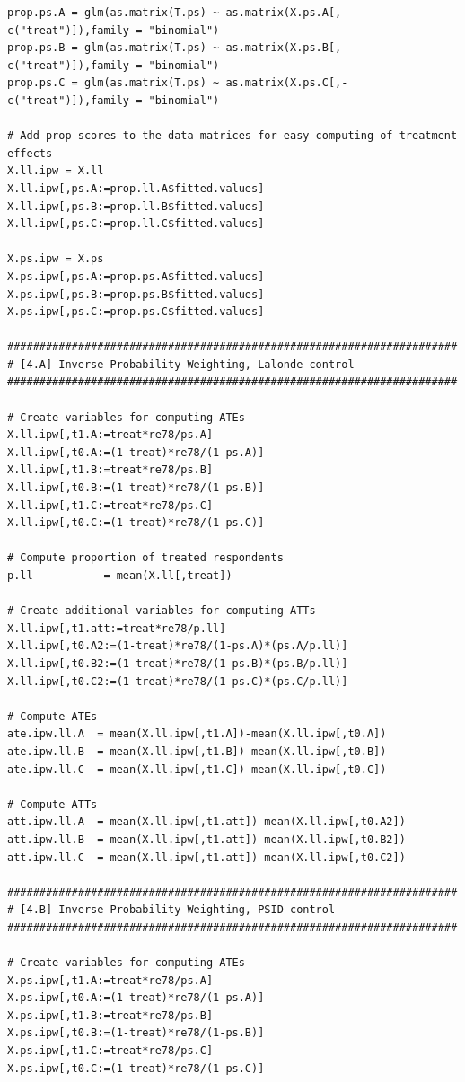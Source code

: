 \documentclass[12pt]{article}
\begin{document}
\begin{verbatim}
prop.ps.A = glm(as.matrix(T.ps) ~ as.matrix(X.ps.A[,-c("treat")]),family = "binomial")
prop.ps.B = glm(as.matrix(T.ps) ~ as.matrix(X.ps.B[,-c("treat")]),family = "binomial")
prop.ps.C = glm(as.matrix(T.ps) ~ as.matrix(X.ps.C[,-c("treat")]),family = "binomial")

# Add prop scores to the data matrices for easy computing of treatment effects
X.ll.ipw = X.ll
X.ll.ipw[,ps.A:=prop.ll.A$fitted.values]
X.ll.ipw[,ps.B:=prop.ll.B$fitted.values]
X.ll.ipw[,ps.C:=prop.ll.C$fitted.values]

X.ps.ipw = X.ps
X.ps.ipw[,ps.A:=prop.ps.A$fitted.values]
X.ps.ipw[,ps.B:=prop.ps.B$fitted.values]
X.ps.ipw[,ps.C:=prop.ps.C$fitted.values]

######################################################################
# [4.A] Inverse Probability Weighting, Lalonde control
######################################################################

# Create variables for computing ATEs 
X.ll.ipw[,t1.A:=treat*re78/ps.A]
X.ll.ipw[,t0.A:=(1-treat)*re78/(1-ps.A)]
X.ll.ipw[,t1.B:=treat*re78/ps.B]
X.ll.ipw[,t0.B:=(1-treat)*re78/(1-ps.B)]
X.ll.ipw[,t1.C:=treat*re78/ps.C]
X.ll.ipw[,t0.C:=(1-treat)*re78/(1-ps.C)]

# Compute proportion of treated respondents
p.ll           = mean(X.ll[,treat])

# Create additional variables for computing ATTs
X.ll.ipw[,t1.att:=treat*re78/p.ll]
X.ll.ipw[,t0.A2:=(1-treat)*re78/(1-ps.A)*(ps.A/p.ll)]
X.ll.ipw[,t0.B2:=(1-treat)*re78/(1-ps.B)*(ps.B/p.ll)]
X.ll.ipw[,t0.C2:=(1-treat)*re78/(1-ps.C)*(ps.C/p.ll)]

# Compute ATEs
ate.ipw.ll.A  = mean(X.ll.ipw[,t1.A])-mean(X.ll.ipw[,t0.A])
ate.ipw.ll.B  = mean(X.ll.ipw[,t1.B])-mean(X.ll.ipw[,t0.B])
ate.ipw.ll.C  = mean(X.ll.ipw[,t1.C])-mean(X.ll.ipw[,t0.C])

# Compute ATTs
att.ipw.ll.A  = mean(X.ll.ipw[,t1.att])-mean(X.ll.ipw[,t0.A2])
att.ipw.ll.B  = mean(X.ll.ipw[,t1.att])-mean(X.ll.ipw[,t0.B2])
att.ipw.ll.C  = mean(X.ll.ipw[,t1.att])-mean(X.ll.ipw[,t0.C2])

######################################################################
# [4.B] Inverse Probability Weighting, PSID control
######################################################################

# Create variables for computing ATEs 
X.ps.ipw[,t1.A:=treat*re78/ps.A]
X.ps.ipw[,t0.A:=(1-treat)*re78/(1-ps.A)]
X.ps.ipw[,t1.B:=treat*re78/ps.B]
X.ps.ipw[,t0.B:=(1-treat)*re78/(1-ps.B)]
X.ps.ipw[,t1.C:=treat*re78/ps.C]
X.ps.ipw[,t0.C:=(1-treat)*re78/(1-ps.C)]


\end{verbatim}
\end{document}
